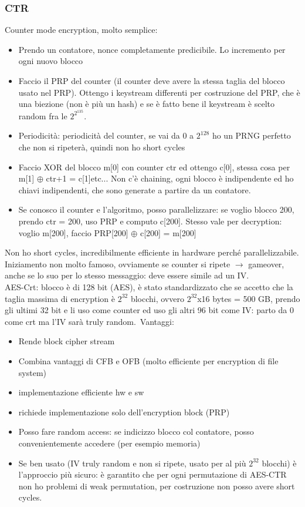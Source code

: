 \documentclass[16px]{article}
\begin{document}
\subsubsection{CTR}
Counter mode encryption, molto semplice:
\begin{itemize}
\item Prendo un contatore, nonce completamente predicibile. Lo incremento per ogni nuovo blocco
\item Faccio il PRP del counter (il counter deve avere la stessa taglia del blocco usato nel PRP). Ottengo i keystream differenti per costruzione del PRP, che è una biezione (non è più un hash) e se è fatto bene il keystream è scelto random fra le $2^{2^{135}}$.
\item Periodicità: periodicità del counter, se vai da 0 a $2^{128}$ ho un PRNG perfetto che non si ripeterà, quindi non ho short cycles
\item Faccio XOR del blocco m[0] con counter ctr ed ottengo c[0], stessa cosa per m[1] $\oplus$ ctr+1 = c[1]etc... Non c'è chaining, ogni blocco è indipendente ed ho chiavi indipendenti, che sono generate a partire da un contatore.
\item Se conosco il counter e l'algoritmo, posso parallelizzare: se voglio blocco 200, prendo ctr = 200, uso PRP e computo c[200]. Stesso vale per decryption: voglio m[200], faccio PRP[200] $\oplus$ c[200] = m[200]
\end{itemize}
Non ho short cycles, incredibilmente efficiente in hardware perché parallelizzabile.\\ Iniziamento non molto famoso, ovviamente se counter si ripete $\rightarrow$ gameover, anche se lo suo per lo stesso messaggio: deve essere simile ad un IV.\\ AES-Crt: blocco è di 128 bit (AES), è stato standardizzato che se accetto che la taglia massima di encryption è $2^32$ blocchi, ovvero $2^32$x16 bytes = 500 GB, prendo gli ultimi 32 bit e li uso come counter ed uso gli altri 96 bit come IV: parto da 0 come crt ma l'IV sarà truly random.\ Vantaggi:
\begin{itemize}
\item Rende block cipher stream
\item Combina vantaggi di CFB e OFB (molto efficiente per encryption di file system)
\item implementazione efficiente hw e sw
\item richiede implementazione solo dell'encryption block (PRP)
\item Posso fare random access: se indicizzo blocco col contatore, posso convenientemente accedere (per esempio memoria)
\item Se ben usato (IV truly random e non si ripete, usato per al più $2^{32}$ blocchi) è l'approccio più sicuro: è garantito che per ogni permutazione di AES-CTR non ho problemi di weak permutation, per costruzione non posso avere short cycles.
\end{itemize}
\end{document}
